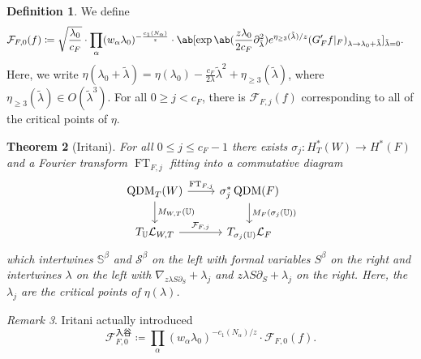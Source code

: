 \documentclass{amsart}
\newtheorem{thm}{Theorem}[section]
\theoremstyle{definition}
\newtheorem{defn}[thm]{Definition}
\theoremstyle{remark}
\newtheorem{rmk}[thm]{Remark}
\theoremstyle{plain}
\theoremstyle{definition}
\theoremstyle{remark}
\newcommand{\bS}{\mathbb{S}}
\renewcommand{\mc}[1]{\mathcal{#1}}
\newcommand{\1}{\mathbf{1}}
\newcommand{\2}{\mathbf{2}}
\newcommand{\3}{\mathbf{3}}
\DeclareMathOperator{\QDM}{QDM}
\DeclareMathOperator{\FT}{FT}
\begin{document}
\begin{defn}
    We define
    \begin{align*}
        \mc{F}_{F,0}(f) \coloneqq{}& \sqrt{\frac{\lambda_0}{c_F}} \cdot \prod_{\alpha}(w_{\alpha}\lambda_0)^{-\frac{c_1(N_{\alpha})}{z}} \cdot \ab[\exp \ab(\frac{z \lambda_0}{2c_F} \partial_{\tilde{\lambda}}^2) e^{\eta_{\geq 3}(\tilde{\lambda})/z} (G_F' f|_F)_{\lambda \to \lambda_0 + \tilde{\lambda}}]_{\tilde{\lambda} = 0}.
    \end{align*}
    Here, we write \(\eta(\lambda_0 + \tilde{\lambda}) = \eta(\lambda_0) - \frac{c_F}{2\lambda} \tilde{\lambda}^2 + \eta_{\geq 3}(\tilde{\lambda})\), where \(\eta_{\geq 3}(\tilde{\lambda}) \in O(\tilde{\lambda}^3)\). For all \(0 \geq j < c_F\), there is \(\mc{F}_{F, j}(f)\) corresponding to all of the critical points of \(\eta\).
\end{defn}

\begin{thm}[Iritani]
    For all \(0 \leq j \leq c_F - 1\) there exists \(\sigma_j \colon H_T^*(W) \to H^*(F)\) and a Fourier transform \(\FT_{F, j}\) fitting into a commutative diagram
    \begin{equation*}
    \begin{tikzcd}
        \QDM_T(W) \ar{r}{\FT_{F,j}} \ar{d}{M_{W,T}(\mathbb{U})} & \sigma_j^* \QDM(F) \ar{d}{M_F(\sigma_j(\mathbb{U}))} \\
        T_{\mathbb{U}} \mc{L}_{W,T} \ar{r}{\mc{F}_{F,j}} & T_{\sigma_j(\mathbb{U})} \mc{L}_F
    \end{tikzcd}
    \end{equation*}
    which intertwines \(\bS^{\beta}\) and \(\mc{S}^{\beta}\) on the left with formal variables \(S^{\beta}\) on the right and intertwines \(\lambda\) on the left with \(\nabla_{z \lambda S \partial_S} + \lambda_j\) and \(z \lambda S \partial_S + \lambda_j\) on the right. Here, the \(\lambda_j\) are the critical points of \(\eta (\lambda)\).
\end{thm}

\begin{rmk}
    Iritani actually introduced
    \[ \mc{F}_{F,0}^{入谷} \coloneqq \prod_{\alpha} (w_{\alpha} \lambda_0)^{-c_1(N_{\alpha})/z} \cdot \mc{F}_{F, 0}(f). \]
\end{rmk}
\end{document}
